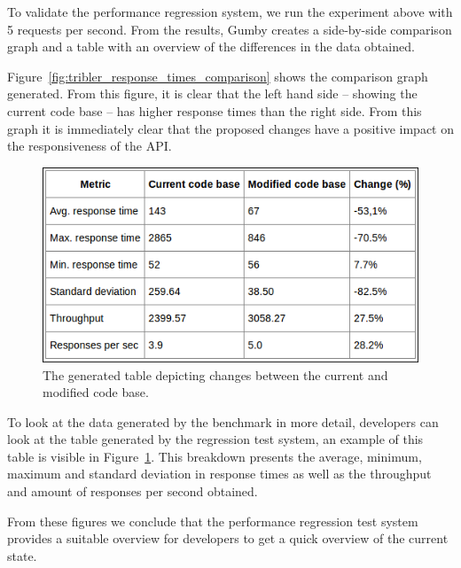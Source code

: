 To validate the performance regression system, we run the experiment above with 5 requests per second.
From the results, Gumby creates a side-by-side comparison graph and a table with an overview of the differences in the data obtained.

Figure~\ref{fig:tribler_response_times_comparison} shows the comparison graph generated.
From this figure, it is clear that the left hand side -- showing the current code base -- has higher response times than the right side.
From this graph it is immediately clear that the proposed changes have a positive impact on the responsiveness of the API.

\begin{figure}[!h]
	\centering
	\includegraphics[width=\linewidth]{experimentation/images/table_changes}
	\caption{The generated table depicting changes between the current and modified code base.}
	\label{fig:compare_table}
\end{figure} 

To look at the data generated by the benchmark in more detail, developers can look at the table generated by the regression test system, an example of this table is visible in Figure~\ref{fig:compare_table}.
This breakdown presents the average, minimum, maximum and standard deviation in response times as well as the throughput and amount of responses per second obtained.

From these figures we conclude that the performance regression test system provides a suitable overview for developers to get a quick overview of the current state.

